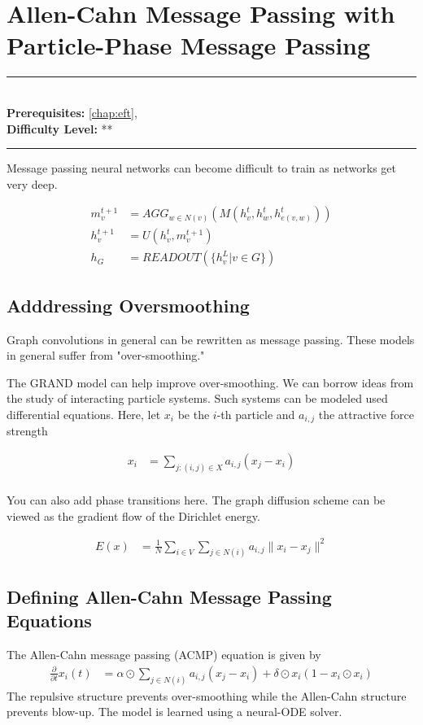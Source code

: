 \documentclass[book.tex]{subfiles}
\begin{document}
\chapter{Allen-Cahn Message Passing with Particle-Phase Message Passing}
\label{chap:allen_cahn}
\noindent\rule{11cm}{0.4pt} \\
\textbf{Prerequisites:}  \autoref{chap:eft},   \\
\textbf{Difficulty Level:} ** \\
\noindent\rule{11cm}{0.4pt}
\vspace{5mm}

Message passing neural networks can become difficult to train as networks get very deep. 

\begin{align}
m^{t+1}_v &= AGG_{w \in N(v)}(M(h^t_v, h^t_w, h^t_{e(v,w)}))\\
h^{t+1}_v &= U(h^t_v, m^{t+1}_v) \\
h_G &= READOUT(\{h^L_v | v \in G \})
\end{align}



\section{Adddressing Oversmoothing}

Graph convolutions in general can be rewritten as message passing. These models in general suffer from "over-smoothing."

The GRAND model can help improve over-smoothing. We can borrow ideas from the study of interacting particle systems. Such systems can be modeled used differential equations. Here, let $x_i$ be the $i$-th particle and $a_{i,j}$ the attractive force strength

\begin{align}
x_i &= \sum_{j: (i, j) \in X} a_{i,j}(x_j - x_i) \\
\end{align}

You can also add phase transitions here. The graph diffusion scheme can be viewed as the gradient flow of the Dirichlet energy. 

\begin{align}
E(x) &= \frac{1}{N} \sum_{i \in V} \sum_{j \in N(i)} a_{i,j} \|x_i - x_j\|^2
\end{align}

\section{Defining Allen-Cahn Message Passing Equations}
The Allen-Cahn message passing (ACMP) equation is given by
\begin{align}
\frac{\partial}{\partial t} x_i(t) &= \alpha \odot \sum_{j \in N(i)} a_{i,j} (x_j - x_i) + \delta \odot x_i (1 - x_i \odot x_i)
\end{align}
The repulsive structure prevents over-smoothing while the Allen-Cahn structure prevents blow-up.  The model is learned using a neural-ODE solver. 
\end{document}

